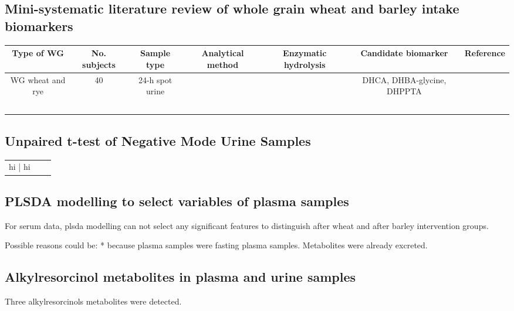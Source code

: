 \subsection{Mini-systematic literature review of whole grain wheat and barley intake biomarkers}

\begin{tabular}{|c|c|c|c|c|c|c|}
	\hline 
	Type of WG & No. subjects  & Sample type  & Analytical method & Enzymatic hydrolysis & Candidate biomarker & Reference \\ 
	\hline 
	WG wheat and rye & 40 & 24-h spot urine &  &  & DHCA, DHBA-glycine, DHPPTA & \\ 
	\hline 
	&  &  &  &  & & \\ 
	\hline 
	&  &  &  &  & & \\ 
	\hline 
	&  &  &  &  & & \\ 
	\hline 
	&  &  &  &  & & \\ 
	\hline 
	&  &  &  &  & & \\ 
	\hline 
\end{tabular} 


\subsection{Unpaired t-test of Negative Mode Urine Samples}
\begin{tabular}{c|c|c}
	hi | hi
\end{tabular}

\subsection{PLSDA modelling to select variables of plasma samples}
For serum data, plsda modelling can not select any significant features to distinguish after wheat and after barley intervention groups.

Possible reasons could be:
* because plasma samples were fasting plasma samples. Metabolites were already excreted.


\subsection{Alkylresorcinol metabolites in plasma and urine samples}
Three alkylresorcinols metabolites were detected. 